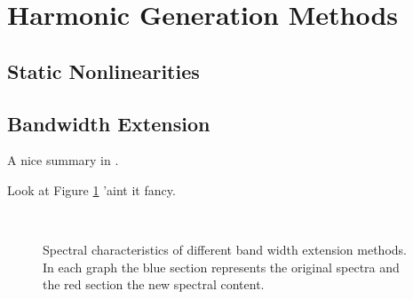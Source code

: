 \section{Harmonic Generation Methods}
\label{sec:Excitation-Methods}

	\subsection{Static Nonlinearities}
	\label{sec:Excitation-Statics}

	\subsection{Bandwidth Extension}
	\label{sec:Excitation-BWE}
		\note
		{
			A nice summary in \citet{larsen2004audio}.

			Look at Figure \ref{fig:SpectralFolding} 'aint it fancy.
		}

		\begin{figure}[h!]
			\centering
			\\
			\caption{Spectral characteristics of different band width extension methods. In each graph the blue section represents the original spectra and the red section the new spectral content.}
			\label{fig:SpectralFolding}
		\end{figure}


